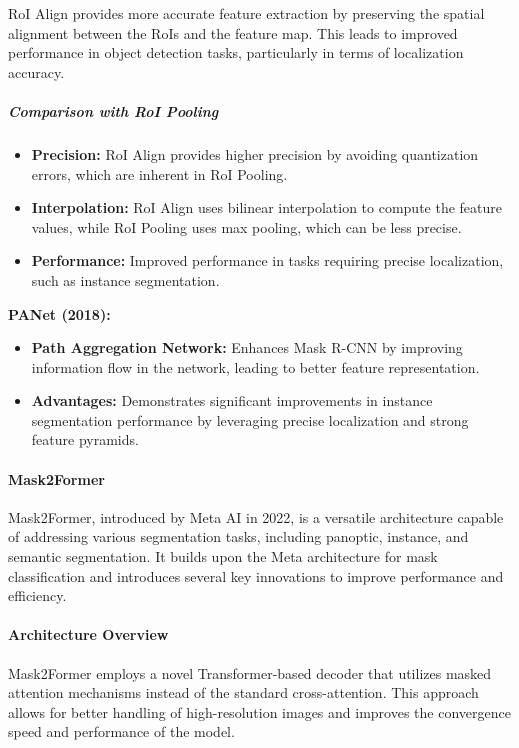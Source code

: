 \documentclass[12pt]{article}
\begin{document}
RoI Align provides more accurate feature extraction by preserving the spatial alignment between the RoIs and the feature map. This leads to improved performance in object detection tasks, particularly in terms of localization accuracy.

\subparagraph{Comparison with RoI Pooling}

\begin{itemize}
    \item \textbf{Precision:} RoI Align provides higher precision by avoiding quantization errors, which are inherent in RoI Pooling.
    \item \textbf{Interpolation:} RoI Align uses bilinear interpolation to compute the feature values, while RoI Pooling uses max pooling, which can be less precise.
    \item \textbf{Performance:} Improved performance in tasks requiring precise localization, such as instance segmentation.
\end{itemize}

\textbf{PANet (2018):}
\begin{itemize}
    \item \textbf{Path Aggregation Network:} Enhances Mask R-CNN by improving information flow in the network, leading to better feature representation.
    \item \textbf{Advantages:} Demonstrates significant improvements in instance segmentation performance by leveraging precise localization and strong feature pyramids.
\end{itemize}

\paragraph{Mask2Former}

Mask2Former, introduced by Meta AI in 2022, is a versatile architecture capable of addressing various segmentation tasks, including panoptic, instance, and semantic segmentation. It builds upon the Meta architecture for mask classification and introduces several key innovations to improve performance and efficiency.

\paragraph{Architecture Overview}

Mask2Former employs a novel Transformer-based decoder that utilizes masked attention mechanisms instead of the standard cross-attention. This approach allows for better handling of high-resolution images and improves the convergence speed and performance of the model.
\end{document}
